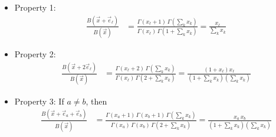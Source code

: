 \documentclass{article}
\theoremstyle{definition}
\begin{document}
\begin{itemize}

\item Property 1:
\begin{align*}
\frac{B(\vec x + \vec e_\ell)}{B(\vec x)}
&= \frac{\Gamma(x_\ell + 1) \, \Gamma(\sum_k x_k)}
        {\Gamma(x_\ell) \, \Gamma(1 + \sum_k x_k)}
= \frac{x_\ell}{\sum_k x_k}
\end{align*}

\item Property 2:
\begin{align*}
\frac{B(\vec x + 2\vec e_\ell)}{B(\vec x)}
&= \frac{\Gamma(x_\ell + 2) \, \Gamma(\sum_k x_k)}
        {\Gamma(x_\ell) \, \Gamma(2 + \sum_k x_k)}
= \frac{(1 + x_\ell) x_\ell}{(1 + \sum_k x_k) (\sum_k x_k)}
\end{align*}

\item Property 3:
If $a \neq b$, then
\begin{align*}
\frac{B(\vec x + \vec e_a + \vec e_b)}{B(\vec x)}
&= \frac{\Gamma(x_a + 1) \, \Gamma(x_b + 1) \, \Gamma(\sum_k x_k)}
        {\Gamma(x_a) \, \Gamma(x_b) \, \Gamma(2 + \sum_k x_k)}
= \frac{x_a \, x_b}{(1 + \sum_k x_k) (\sum_k x_k)}
\end{align*}

\end{itemize}
\end{document}
